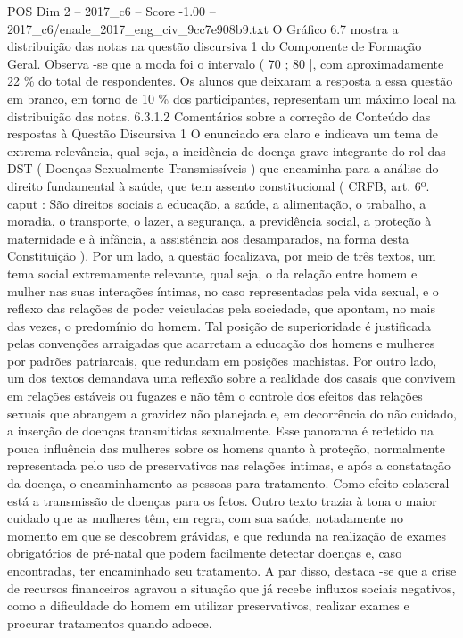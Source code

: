 \begin{textsample}{POS Dim 2 – 2017\_c6 – Score -1.00 – 2017\_c6/enade\_2017\_eng\_civ\_9cc7e908b9.txt}
O Gráfico 6.7 mostra a distribuição das notas na questão discursiva 1 do Componente de Formação Geral.
Observa -se que a moda foi o intervalo ( 70 ; 80 ], com aproximadamente 22 \% do total de respondentes.
Os alunos que deixaram a resposta a essa questão em branco, em torno de 10 \% dos participantes, representam um máximo local na distribuição das notas. 6.3.1.2 Comentários sobre a correção de Conteúdo das respostas à Questão Discursiva 1 O enunciado era claro e indicava um tema de extrema relevância, qual seja, a incidência de doença grave integrante do rol das DST ( Doenças Sexualmente Transmissíveis ) que encaminha para a análise do direito fundamental à saúde, que tem assento constitucional ( CRFB, art. 6º. caput : São direitos sociais a educação, a saúde, a alimentação, o trabalho, a moradia, o transporte, o lazer, a segurança, a previdência social, a proteção à maternidade e à infância, a assistência aos desamparados, na forma desta Constituição ).
Por um lado, a questão focalizava, por meio de três textos, um tema social extremamente relevante, qual seja, o da relação entre homem e mulher nas suas interações íntimas, no caso representadas pela vida sexual, e o reflexo das relações de poder veiculadas pela sociedade, que apontam, no mais das vezes, o predomínio do homem.
Tal posição de superioridade é justificada pelas convenções arraigadas que acarretam a educação dos homens e mulheres por padrões patriarcais, que redundam em posições machistas.
Por outro lado, um dos textos demandava uma reflexão sobre a realidade dos casais que convivem em relações estáveis ou fugazes e não têm o controle dos efeitos das relações sexuais que abrangem a gravidez não planejada e, em decorrência do não cuidado, a inserção de doenças transmitidas sexualmente.
Esse panorama é refletido na pouca influência das mulheres sobre os homens quanto à proteção, normalmente representada pelo uso de preservativos nas relações intimas, e após a constatação da doença, o encaminhamento as pessoas para tratamento.
Como efeito colateral está a transmissão de doenças para os fetos.
Outro texto trazia à tona o maior cuidado que as mulheres têm, em regra, com sua saúde, notadamente no momento em que se descobrem grávidas, e que redunda na realização de exames obrigatórios de pré-natal que podem facilmente detectar doenças e, caso encontradas, ter encaminhado seu tratamento.
A par disso, destaca -se que a crise de recursos financeiros agravou a situação que já recebe influxos sociais negativos, como a dificuldade do homem em utilizar preservativos, realizar exames e procurar tratamentos quando adoece.

\end{textsample}
